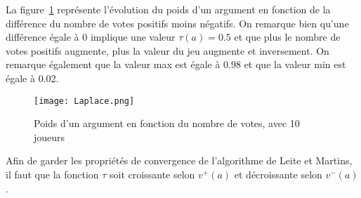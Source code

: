 \documentclass[11pt]{article}
\theoremstyle{defi}
\theoremstyle{not}
\theoremstyle{prob}
\begin{document}
    La figure~\ref{fig:Laplace} représente l'évolution du poids d'un argument en fonction de la différence du nombre de votes positifs moins négatifs.
    On remarque bien qu'une différence égale à 0 implique une valeur $\tau(a) = 0.5$ et que plus le nombre de votes positifs augmente, plus la valeur du jeu augmente et inversement.
    On remarque également que la valeur max est égale à $0.98$ et que la valeur min est égale à 0.02.

    \begin{figure}
      \center
      \texttt{[image: Laplace.png]}
      \label{fig:Laplace}
      \caption{Poids d'un argument en fonction du nombre de votes, avec 10 joueurs}
    \end{figure}


    Afin de garder les propriétés de convergence de l'algorithme de Leite et Martins, il faut que la fonction $\tau$ soit croissante selon $v^+(a)$ et décroissante selon $v^-(a)$.
\end{document}
